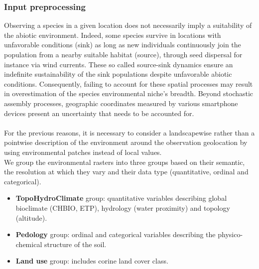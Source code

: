 \documentclass[]{article}
\begin{document}
\subsubsection{Input preprocessing}
Observing a species in a given location does not necessarily imply a suitability of the abiotic environment. Indeed, some species survive in locations with unfavorable conditions (sink) as long as new individuals continuously join the population from a nearby suitable habitat (source), through seed dispersal for instance via wind currents. These so called source-sink dynamics \cite{holt1985population} ensure an indefinite sustainability of the sink populations despite unfavorable abiotic conditions. %
Consequently, failing to account for these spatial processes may result in overestimation of the species environmental niche's breadth.
Beyond stochastic assembly processes, geographic coordinates measured by various smartphone devices present an uncertainty that needs to be accounted for.\\\\
\noindent For the previous reasons, it is necessary to consider a landscapewise rather than a pointwise description of the environment around the observation geolocation by using environmental patches instead of local values.\\ 

\noindent We group the environmental rasters into three groups based on their semantic, the resolution at which they vary and their data type (quantitative, ordinal and categorical). 

\begin{itemize}
	\item \textbf{TopoHydroClimate} group: quantitative variables describing global bioclimate (CHBIO, ETP), hydrology (water proximity) and topology (altitude).
	\item \textbf{Pedology} group: ordinal and categorical variables describing the physico-chemical structure of the soil.
	\item \textbf{Land use} group: includes corine land cover class. 
\end{itemize}
\end{document}
